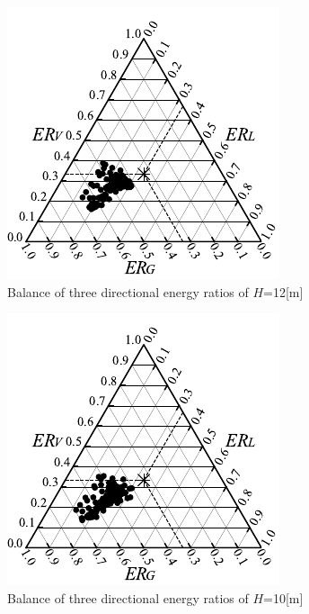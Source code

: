 \begin{figure}[htbp]
    \centering
    \includegraphics[keepaspectratio,scale=1.2]{05_att/rec_Ternary_out_12m.pdf}
    \caption{\hspace{1mm}Balance of three directional energy ratios of $H$=12[m]}
    \label{fig:sankaku12}
\end{figure}

\begin{figure}[htbp]
    \centering
    \includegraphics[keepaspectratio,scale=1.2]{05_att/rec_Ternary_out_10m.pdf}
    \caption{\hspace{1mm}Balance of three directional energy ratios of $H$=10[m]}
    \label{fig:sankaku10}
\end{figure}

